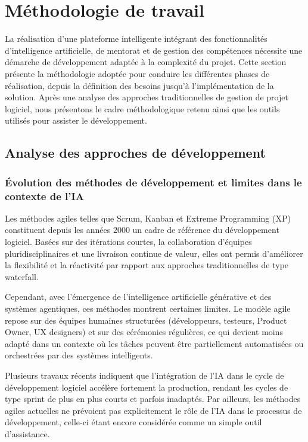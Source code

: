 \section{Méthodologie de travail}

La réalisation d'une plateforme intelligente intégrant des fonctionnalités d'intelligence 
artificielle, de mentorat et de gestion des compétences nécessite une démarche de développement 
adaptée à la complexité du projet. Cette section présente la méthodologie adoptée pour conduire 
les différentes phases de réalisation, depuis la définition des besoins jusqu'à l'implémentation 
de la solution. Après une analyse des approches traditionnelles de gestion de projet logiciel, nous présentons 
le cadre méthodologique retenu ainsi que les outils utilisés pour assister le développement.



\subsection{Analyse des approches de développement}

\subsubsection{Évolution des méthodes de développement et limites dans le contexte de l'IA}

Les méthodes agiles telles que Scrum, Kanban et Extreme Programming (XP) constituent depuis les années 2000 un cadre de référence du développement logiciel. Basées sur des itérations courtes, la collaboration d'équipes pluridisciplinaires et une livraison continue de valeur, elles ont permis d'améliorer la flexibilité et la réactivité par rapport aux approches traditionnelles de type waterfall.

Cependant, avec l'émergence de l'intelligence artificielle générative et des systèmes agentiques, ces méthodes montrent certaines limites. Le modèle agile repose sur des équipes humaines structurées (développeurs, testeurs, Product Owner, UX designers) et sur des cérémonies régulières, ce qui devient moins adapté dans un contexte où les tâches peuvent être partiellement automatisées ou orchestrées par des systèmes intelligents.

Plusieurs travaux récents indiquent que l'intégration de l'IA dans le cycle de développement logiciel accélère fortement la production, rendant les cycles de type sprint de plus en plus courts et parfois inadaptés. Par ailleurs, les méthodes agiles actuelles ne prévoient pas explicitement le rôle de l'IA dans le processus de développement, celle-ci étant encore considérée comme un simple outil d'assistance.

